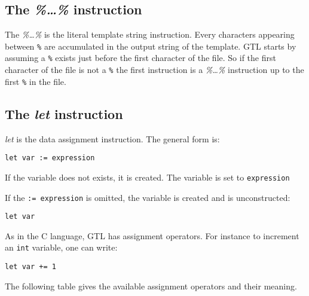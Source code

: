 \documentclass[11pt]{article}
\begin{document}
{\subsection{The {\em \%\ldots\%} instruction}

The {\em \%\ldots\%} is the literal template string instruction. Every characters appearing between \lstinline{%} are accumulated in the output string of the template. GTL starts by assuming a \lstinline{%} exists just before the first character of the file. So if the first character of the file is not a \lstinline{%} the first instruction is a {\em \%\ldots\%} instruction up to the first \lstinline{%} in the file. 

\subsection{The {\em let} instruction}

{\em let} is the data assignment instruction. The general form is:

\begin{lstlisting}
let var := expression
\end{lstlisting}

If the variable does not exists, it is created. The variable is set to \lstinline{expression}

If the \lstinline{:= expression} is omitted, the variable is created and is unconstructed:

\begin{lstlisting}
let var
\end{lstlisting}


As in the C language, GTL has assignment operators. For instance to increment an \lstinline{int} variable, one can write: 

\begin{lstlisting}
let var += 1
\end{lstlisting}

The following table gives the available assignment operators and their meaning.

}
\end{document}
